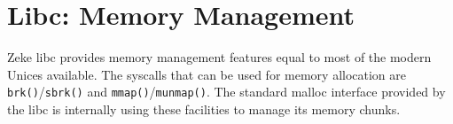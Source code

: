 \chapter{Libc: Memory Management}

Zeke libc provides memory management features equal to most of the modern Unices
available. The syscalls that can be used for memory allocation are
\verb+brk()+/\verb+sbrk()+ and \verb+mmap()+/\verb+munmap()+.  The standard
malloc interface provided by the libc is internally using these facilities to
manage its memory chunks.
